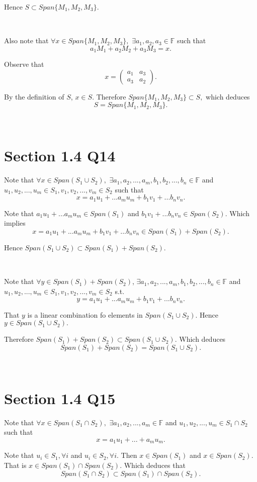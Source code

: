 \documentclass[12pt]{article}%
\begin{document}
Hence $S \subset Span\{M_1,M_2,M_3\}.$ 

~\ 

Also note that $\forall x \in Span\{M_1,M_2,M_3\},$ $\exists a_1,a_2,a_3 \in \mathbb{F}$ such that $$a_1M_1+a_2M_2+a_3M_3=x.$$

Observe that $$x=\begin{pmatrix}
    a_1 & a_3
    \\a_3 & a_2
\end{pmatrix}.$$ 

By the definition of $S$, $x \in S.$ Therefore $ Span\{M_1,M_2,M_3\} \subset S,$ which deduces $$S=Span\{M_1,M_2,M_3\}.$$

~\ 

\section{Section 1.4 Q14}

Note that $\forall x \in Span(S_1 \cup S_2),$ $\exists a_1,a_2,...,a_m,b_1,b_2,...,b_n \in \mathbb{F}$ and $u_1,u_2,...,u_m \in S_1, v_1,v_2,...,v_m \in S_2$ such that $$x=a_1u_1+...a_mu_m+b_1v_1+...b_nv_n.$$

Note that $a_1u_1+...a_mu_m \in Span(S_1)$ and $b_1v_1+...b_nv_n \in Span(S_2).$ Which implies $$x=a_1u_1+...a_mu_m+b_1v_1+...b_nv_n \in Span(S_1)+Span(S_2).$$ 

Hence $ Span(S_1 \cup S_2) \subset Span(S_1)+Span(S_2).$ 

~\ 

Note that $\forall y \in Span(S_1)+Span(S_2)$, $\exists a_1,a_2,...,a_m,b_1,b_2,...,b_n \in \mathbb{F}$ and $u_1,u_2,...,u_m \in S_1, v_1,v_2,...,v_m \in S_2$ s.t. $$y=a_1u_1+...a_mu_m+b_1v_1+...b_nv_n.$$

That $y$ is a linear combination fo elements in $Span(S_1 \cup S_2).$ Hence $y \in Span(S_1 \cup S_2).$ 

Therefore $Span(S_1)+Span(S_2) \subset Span(S_1 \cup S_2).$ Which deduces $$Span(S_1)+Span(S_2) = Span(S_1 \cup S_2).$$

~\ 

\section{Section 1.4 Q15}

Note that $\forall x\in Span(S_1 \cap S_2),$ $\exists a_1,a_2,...,a_m \in \mathbb{F}$ and $u_1,u_2,...,u_m \in S_1 \cap S_2$ such that $$x=a_1u_1+...+a_mu_m.$$ 

Note that $u_i \in S_1, \forall i$ and $u_i \in S_2, \forall i.$ Then $x \in Span(S_1)$ and $x \in Span(S_2).$ That is $x \in Span(S_1) \cap Span(S_2).$ Which deduces that $$Span(S_1 \cap S_2) \subset Span(S_1) \cap Span(S_2).$$
\end{document}
